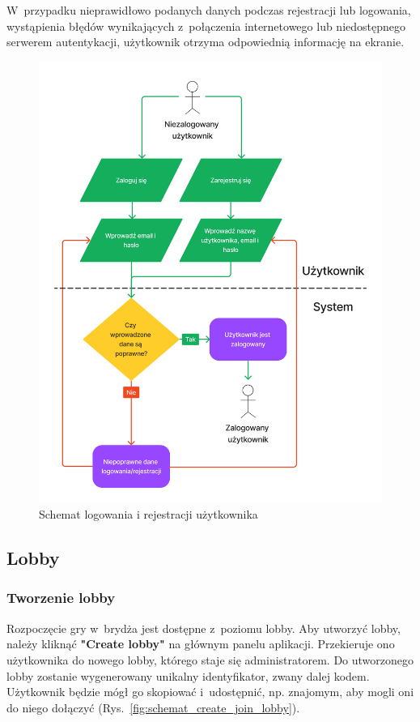 W~przypadku nieprawidłowo podanych danych podczas rejestracji
lub logowania, wystąpienia błędów wynikających z~połączenia internetowego lub
niedostępnego serwerem autentykacji, użytkownik otrzyma odpowiednią
informację na ekranie.

\begin{figure}[h]
  \centering
  \includegraphics[width=\textwidth]{img/schematy/login.png}
  \caption{Schemat logowania i rejestracji użytkownika}
  \label{fig:schemat_login}
\end{figure}

\FloatBarrier

\subsection{Lobby}
\subsubsection{Tworzenie lobby}

Rozpoczęcie gry w~brydża jest dostępne z~poziomu lobby. Aby utworzyć
lobby, należy kliknąć \textbf{"Create lobby"} na głównym panelu
aplikacji. Przekieruje ono użytkownika do nowego lobby, którego staje
się administratorem. Do utworzonego lobby zostanie wygenerowany
unikalny identyfikator, zwany dalej kodem. Użytkownik będzie mógł go skopiować
i~udostępnić, np. znajomym, aby mogli oni do niego dołączyć (Rys.~\ref{fig:schemat_create_join_lobby}).


